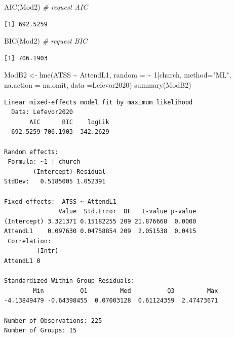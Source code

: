 \documentclass[
  english,
]{book}
\newenvironment{Shaded}{\begin{snugshade}}{\end{snugshade}}
\newcommand{\AttributeTok}[1]{\textcolor[rgb]{0.77,0.63,0.00}{#1}}
\newcommand{\CommentTok}[1]{\textcolor[rgb]{0.56,0.35,0.01}{\textit{#1}}}
\newcommand{\DecValTok}[1]{\textcolor[rgb]{0.00,0.00,0.81}{#1}}
\newcommand{\FunctionTok}[1]{\textcolor[rgb]{0.00,0.00,0.00}{#1}}
\newcommand{\NormalTok}[1]{#1}
\newcommand{\OtherTok}[1]{\textcolor[rgb]{0.56,0.35,0.01}{#1}}
\newcommand{\SpecialCharTok}[1]{\textcolor[rgb]{0.00,0.00,0.00}{#1}}
\newcommand{\StringTok}[1]{\textcolor[rgb]{0.31,0.60,0.02}{#1}}
\begin{document}
\begin{Shaded}
\begin{Highlighting}[]
\FunctionTok{AIC}\NormalTok{(Mod2) }\CommentTok{\# request AIC}
\end{Highlighting}
\end{Shaded}

\begin{verbatim}
[1] 692.5259
\end{verbatim}

\begin{Shaded}
\begin{Highlighting}[]
\FunctionTok{BIC}\NormalTok{(Mod2) }\CommentTok{\# request BIC}
\end{Highlighting}
\end{Shaded}

\begin{verbatim}
[1] 706.1903
\end{verbatim}

\begin{Shaded}
\begin{Highlighting}[]
\NormalTok{ModB2 }\OtherTok{\textless{}{-}} \FunctionTok{lme}\NormalTok{(ATSS }\SpecialCharTok{\textasciitilde{}}\NormalTok{  AttendL1, }\AttributeTok{random =} \SpecialCharTok{\textasciitilde{}} \DecValTok{1}\SpecialCharTok{|}\NormalTok{church, }\AttributeTok{method=}\StringTok{"ML"}\NormalTok{, }\AttributeTok{na.action =}\NormalTok{ na.omit, }\AttributeTok{data =}\NormalTok{Lefevor2020)}
\FunctionTok{summary}\NormalTok{(ModB2)}
\end{Highlighting}
\end{Shaded}

\begin{verbatim}
Linear mixed-effects model fit by maximum likelihood
  Data: Lefevor2020 
       AIC      BIC    logLik
  692.5259 706.1903 -342.2629

Random effects:
 Formula: ~1 | church
        (Intercept) Residual
StdDev:   0.5185005 1.052391

Fixed effects:  ATSS ~ AttendL1 
               Value  Std.Error  DF   t-value p-value
(Intercept) 3.321371 0.15182255 209 21.876668  0.0000
AttendL1    0.097630 0.04758854 209  2.051538  0.0415
 Correlation: 
         (Intr)
AttendL1 0     

Standardized Within-Group Residuals:
        Min          Q1         Med          Q3         Max 
-4.13849479 -0.64398455  0.07003128  0.61124359  2.47473671 

Number of Observations: 225
Number of Groups: 15 
\end{verbatim}
\end{document}
